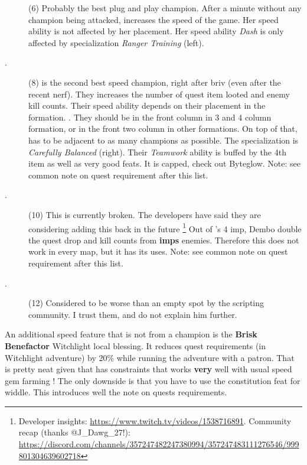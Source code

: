 \documentclass{article}
\begin{document}
\begin{description}
    \item[\shandie] (6) Probably the best plug and play champion.
    After a minute without any champion being attacked, \shandie increases the speed of the game.
    Her speed ability is not affected by her placement.
    Her speed ability \textit{Dash} is only affected by specialization \textit{Ranger Training} (left).
    
    \item[\hewmaan.] (8) \hewmaan is the second best speed champion, right after briv (even after the recent nerf).
    They increases the number of quest item looted and enemy kill counts.
    Their speed ability depends on their placement in the formation.
    \hewmaan.
    They should be in the front column in 3 and 4 column formation, or in the front two column in other formations.
    On top of that, \hewmaan has to be adjacent to as many champions as possible.
    The specialization is \textit{Carefully Balanced} (right).
    Their \textit{Teamwork} ability is buffed by the 4th item as well as very good feats.
    It is capped, check out Byteglow.
    Note: see common note on quest requirement after this list.
    \item[\havilar.] (10) This is currently broken.
    The developers have said they are considering adding this back in the future \footnote{Developer insights: \url{https://www.twitch.tv/videos/1538716891}.
    Community recap (thanks @J\_Dawg\_27!): \url{https://discord.com/channels/357247482247380994/357247483111276546/999801304639602718}}
    Out of \havilar's 4 imp, Dembo double the quest drop and kill counts from \textbf{imps} enemies.
    Therefore this does not work in every map, but it has its uses.
    Note: see common note on quest requirement after this list.
    \item[\melf.] (12) Considered to be worse than an empty spot by the scripting community.
    I trust them, and do not explain him further.
\end{description}

An additional speed feature that is not from a champion is the \textbf{Brisk Benefactor} Witchlight local blessing.
It reduces quest requirements (in Witchlight adventure) by 20\% while running the adventure with a patron.
That is pretty neat given that \vjara has constraints that works \textbf{very} well with usual speed gem farming !
The only downside is that you have to use the constitution feat for widdle.
This introduces well the note on quests requirements.
\end{document}
